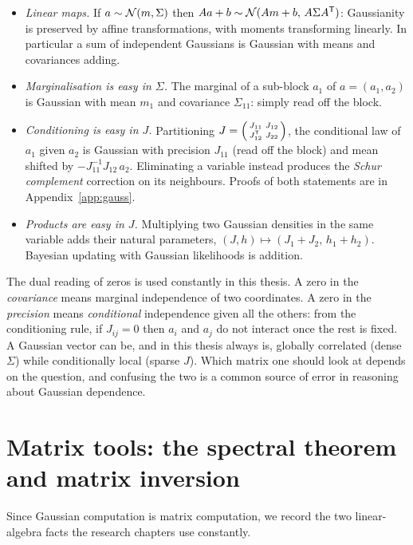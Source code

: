 \begin{itemize}
  \item \emph{Linear maps.} If $a \sim \mathcal{N}(m, \Sigma)$ then
  $Aa + b \sim \mathcal{N}(Am + b,\, A \Sigma A^{\mathsf{T}})$: Gaussianity is preserved by
  affine transformations, with moments transforming linearly. In
  particular a sum of independent Gaussians is Gaussian with means and
  covariances adding.
  \item \emph{Marginalisation is easy in $\Sigma$.} The marginal of a
  sub-block $a_1$ of $a = (a_1, a_2)$ is Gaussian with mean $m_1$ and
  covariance $\Sigma_{11}$: simply read off the block.
  \item \emph{Conditioning is easy in $J$.} Partitioning
  $J = \begin{psmallmatrix} J_{11} & J_{12} \\ J_{12}^{\mathsf{T}} & J_{22}
  \end{psmallmatrix}$, the conditional law of $a_1$ given $a_2$ is
  Gaussian with precision $J_{11}$ (read off the block) and mean shifted
  by $-J_{11}^{-1} J_{12}\, a_2$. Eliminating a variable instead produces
  the \emph{Schur complement} correction on its neighbours. Proofs of
  both statements are in Appendix~\ref{app:gauss}.
  \item \emph{Products are easy in $J$.} Multiplying two Gaussian
  densities in the same variable adds their natural parameters,
  $(J, h) \mapsto (J_1 + J_2,\, h_1 + h_2)$. Bayesian updating with
  Gaussian likelihoods is addition.
\end{itemize}

The dual reading of zeros is used constantly in this thesis. A
zero in the \emph{covariance} means marginal independence of two
coordinates. A zero in the \emph{precision} means \emph{conditional}
independence given all the others: from the conditioning rule, if
$J_{ij} = 0$ then $a_i$ and $a_j$ do not interact once the rest is fixed.
A Gaussian vector can be, and in this thesis always is, globally
correlated (dense $\Sigma$) while conditionally local (sparse $J$). Which
matrix one should look at depends on the question, and confusing the
two is a common source of error in reasoning about Gaussian dependence.

\section{Matrix tools: the spectral theorem and matrix inversion}
\label{sec:matrix-tools}

Since Gaussian computation is matrix computation, we record the two
linear-algebra facts the research chapters use constantly.

